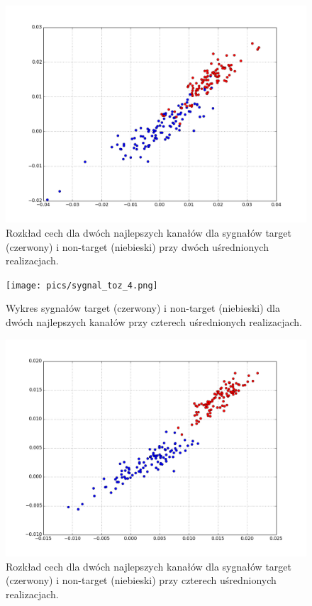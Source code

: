 \documentclass[licencjacka,openright]{pracamgr}
\begin{document}
\begin{figure}[H]
\centering
\includegraphics[scale=0.55, trim=0mm 0mm 0mm 0mm, clip=True]{pics/cecha_toz_2.png}
\caption{Rozkład cech dla dwóch najlepszych kanałów dla sygnałów target (czerwony) i non-target (niebieski) przy dwóch uśrednionych realizacjach.}
\label{cecha_toz_2}
\end{figure}

\begin{figure}[H]
\centering
\texttt{[image: pics/sygnal\_toz\_4.png]}
\caption{Wykres sygnałów target (czerwony) i non-target (niebieski) dla dwóch najlepszych kanałów przy czterech uśrednionych realizacjach.}
\label{sygnal_toz_4}
\end{figure}

\begin{figure}[H]
\centering
\includegraphics[scale=0.55, trim=0mm 0mm 0mm 0mm, clip=True]{pics/cecha_toz_4.png}
\caption{Rozkład cech dla dwóch najlepszych kanałów dla sygnałów target (czerwony) i non-target (niebieski) przy czterech uśrednionych realizacjach.}
\label{cecha_toz_4}
\end{figure}
\end{document}
